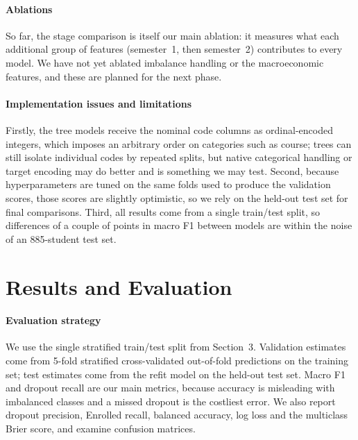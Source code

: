 \documentclass[11pt]{article}
\begin{document}
\paragraph{Ablations} So far, the stage comparison is itself our main ablation: it measures what each additional group of features (semester~1, then semester~2) contributes to every model. We have not yet ablated imbalance handling or the macroeconomic features, and these are planned for the next phase.
 
\paragraph{Implementation issues and limitations} Firstly, the tree models receive the nominal code columns as ordinal-encoded integers, which imposes an arbitrary order on categories such as course; trees can still isolate individual codes by repeated splits, but native categorical handling or target encoding may do better and is something we may test. Second, because hyperparameters are tuned on the same folds used to produce the validation scores, those scores are slightly optimistic, so we rely on the held-out test set for final comparisons. Third, all results come from a single train/test split, so differences of a couple of points in macro F1 between models are within the noise of an 885-student test set.
\section{Results and Evaluation}
\paragraph{Evaluation strategy} We use the single stratified train/test split from Section~3. Validation estimates come from 5-fold stratified cross-validated out-of-fold predictions on the training set; test estimates come from the refit model on the held-out test set. Macro F1 and dropout recall are our main metrics, because accuracy is misleading with imbalanced classes and a missed dropout is the costliest error. We also report dropout precision, Enrolled recall, balanced accuracy, log loss and the multiclass Brier score, and examine confusion matrices.
\end{document}
